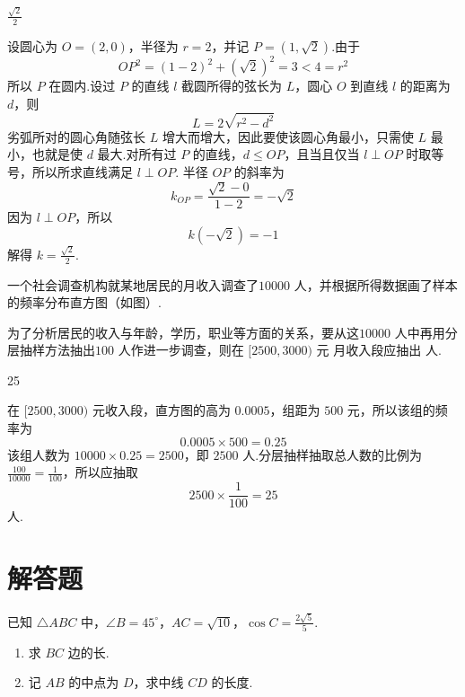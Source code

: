 \begin{answer}
\(\frac{\sqrt{2}}{2}\)
\end{answer}

\begin{solution}
设圆心为 \(O=(2,0)\)，半径为 \(r=2\)，并记 \(P=(1,\sqrt2)\).由于
\[
OP^{2}=(1-2)^{2}+(\sqrt2)^{2}=3<4=r^{2}
\]
所以 \(P\) 在圆内.设过 \(P\) 的直线 \(l\) 截圆所得的弦长为 \(L\)，圆心 \(O\) 到直线 \(l\) 的距离为 \(d\)，则
\[
L=2\sqrt{r^{2}-d^{2}}
\]
劣弧所对的圆心角随弦长 \(L\) 增大而增大，因此要使该圆心角最小，只需使 \(L\) 最小，也就是使 \(d\) 最大.对所有过 \(P\) 的直线，\(d\leq OP\)，且当且仅当 \(l\perp OP\) 时取等号，所以所求直线满足 \(l\perp OP\).
半径 \(OP\) 的斜率为
\[
k_{OP}=\frac{\sqrt2-0}{1-2}=-\sqrt2
\]
因为 \(l\perp OP\)，所以
\[
k(-\sqrt2)=-1
\]
解得 \(k=\frac{\sqrt2}{2}\).
\end{solution}

\begin{problem}
一个社会调查机构就某地居民的月收入调查了\(10000\text{ 人}\)，并根据所得数据画了样本的频率分布直方图（如图）.

为了分析居民的收入与年龄，学历，职业等方面的关系，要从这\(10000\text{ 人}\)中再用分层抽样方法抽出\(100\text{ 人}\)作进一步调查，则在 \([2500, 3000)\text{ 元}\) 月收入段应抽出\fillinblank{}\(\text{ 人}\).

\begin{center}
\end{center}
\end{problem}

\begin{answer}
25
\end{answer}

\begin{solution}
在 \([2500,3000)\text{ 元}\)收入段，直方图的高为 \(0.0005\)，组距为 \(500\text{ 元}\)，所以该组的频率为
\[
0.0005\times500=0.25
\]
该组人数为 \(10000\times0.25=2500\)，即 \(2500\text{ 人}\).分层抽样抽取总人数的比例为 \(\frac{100}{10000}=\frac1{100}\)，所以应抽取
\[
2500\times\frac1{100}=25
\]
人.
\end{solution}

\section{解答题}
\begin{problem}
已知 \(\triangle ABC\) 中，\(\angle B = 45^{\circ}\)，\(AC = \sqrt{10}\)，\(\cos C = \frac{2\sqrt{5}}{5}\).

\begin{enumerate}
\item 求 \(BC\) 边的长.
\item 记 \(AB\) 的中点为 \(D\)，求中线 \(CD\) 的长度.
\end{enumerate}
\end{problem}

